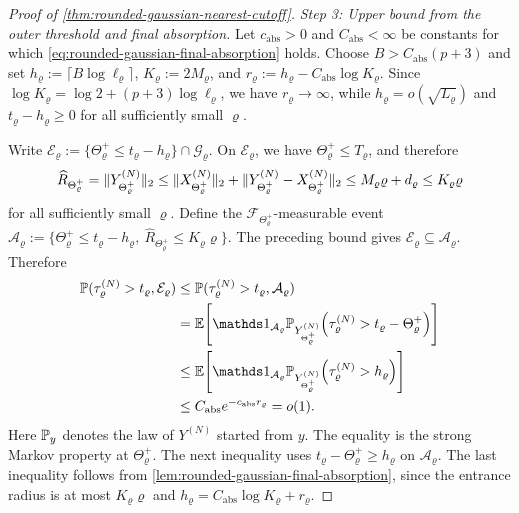 \documentclass[11pt,reqno,a4paper]{article}
\newcommand{\Pp}{\P}
\newcommand{\Ee}{\E}
\begin{document}
\begin{proof}[Proof of \cref{thm:rounded-gaussian-nearest-cutoff}]
  \emph{Step 3: Upper bound from the outer threshold and final absorption.}
  Let $c_{\mathrm{abs}}>0$ and $C_{\mathrm{abs}}<\infty$ be constants for
  which \cref{eq:rounded-gaussian-final-absorption} holds. Choose
  $B>C_{\mathrm{abs}}(p+3)$ and set
  $h_\varrho:=\lceil B\log\ell_\varrho\rceil$,
  $K_\varrho:=2M_\varrho$, and
  $r_\varrho:=h_\varrho-C_{\mathrm{abs}}\log K_\varrho$.
  Since $\log K_\varrho=\log2+(p+3)\log\ell_\varrho$, we have
  $r_\varrho\to\infty$, while $h_\varrho=o(\sqrt{L_\varrho})$ and
  $t_\varrho-h_\varrho\geq0$ for all sufficiently small $\varrho$.

  Write $\mathcal E_\varrho:=
  \{\Theta_\varrho^+\leq t_\varrho-h_\varrho\}\cap
  \mathcal G_\varrho$. On $\mathcal E_\varrho$, we have
  $\Theta_\varrho^+\leq T_\varrho$, and therefore
  \begin{equation*}
    \widehat R_{\Theta_\varrho^+}
    =\lVert Y_{\Theta_\varrho^+}^{(N)}\rVert_2
    \leq
    \lVert X_{\Theta_\varrho^+}^{(N)}\rVert_2
    +\lVert Y_{\Theta_\varrho^+}^{(N)}-X_{\Theta_\varrho^+}^{(N)}\rVert_2
    \leq M_\varrho\varrho+d_\varrho
    \leq K_\varrho\varrho
  \end{equation*}
  for all sufficiently small $\varrho$. Define the
  $\mathcal F_{\Theta_\varrho^+}$-measurable event
  $\mathcal A_\varrho:=\{\Theta_\varrho^+\leq
  t_\varrho-h_\varrho,\ \widehat R_{\Theta_\varrho^+}\leq
  K_\varrho\varrho\}$. The preceding bound gives
  $\mathcal E_\varrho\subseteq\mathcal A_\varrho$. Therefore
  \begin{align*}
    \Pp(\tau_\varrho^{(N)}>t_\varrho,\mathcal E_\varrho)
    &\leq
    \Pp(\tau_\varrho^{(N)}>t_\varrho,\mathcal A_\varrho)
    \\
    &=
    \Ee\left[
      \one_{\mathcal A_\varrho}
      \Pp_{Y_{\Theta_\varrho^+}^{(N)}}\left(
        \tau_\varrho^{(N)}>t_\varrho-\Theta_\varrho^+
      \right)
    \right]
    \\
    &\leq
    \Ee\left[
      \one_{\mathcal A_\varrho}
      \Pp_{Y_{\Theta_\varrho^+}^{(N)}}\left(
        \tau_\varrho^{(N)}>h_\varrho
      \right)
    \right]
    \\
    &\leq
    C_{\mathrm{abs}}e^{-c_{\mathrm{abs}}r_\varrho}
    =o(1).
  \end{align*}
  Here $\Pp_y$ denotes the law of $Y^{(N)}$ started from $y$. The
  equality is the strong Markov property at $\Theta_\varrho^+$. The next
  inequality uses $t_\varrho-\Theta_\varrho^+\geq h_\varrho$ on
  $\mathcal A_\varrho$. The last inequality follows from
  \cref{lem:rounded-gaussian-final-absorption}, since the entrance radius is
  at most $K_\varrho\varrho$ and
  $h_\varrho=C_{\mathrm{abs}}\log K_\varrho+r_\varrho$.


\end{proof}
\end{document}
